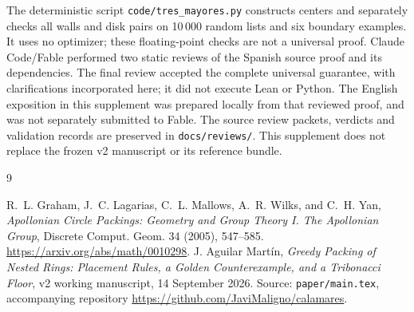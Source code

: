 \documentclass[11pt]{article}
\theoremstyle{remark}
\begin{document}
The deterministic script \texttt{code/tres\_mayores.py} constructs
centers and separately checks all walls and disk pairs on 10\,000
random lists and six boundary examples. It uses no optimizer; these
floating-point checks are not a universal proof. Claude Code/Fable
performed two static reviews of the Spanish source proof and its
dependencies. The final review accepted the complete universal guarantee,
with clarifications incorporated here; it did not execute Lean or Python.
The English exposition in this supplement was prepared locally from that
reviewed proof, and was not separately submitted to Fable.
The source review packets, verdicts and validation records are preserved
in \texttt{docs/reviews/}. This supplement does not replace the frozen
v2 manuscript or its reference bundle.

\begin{thebibliography}{9}
\raggedright
{}
R.~L. Graham, J.~C. Lagarias, C.~L. Mallows, A.~R. Wilks, and C.~H. Yan,
\emph{Apollonian Circle Packings: Geometry and Group Theory I.
The Apollonian Group}, Discrete Comput. Geom. 34 (2005), 547--585.
\url{https://arxiv.org/abs/math/0010298}.
J. Aguilar Mart\'in,
\emph{Greedy Packing of Nested Rings: Placement Rules, a Golden
Counterexample, and a Tribonacci Floor}, v2 working manuscript,
14 September 2026. Source: \texttt{paper/main.tex}, accompanying
repository \url{https://github.com/JaviMaligno/calamares}.
\end{thebibliography}
\end{document}
